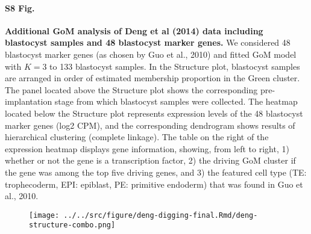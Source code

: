 \documentclass[10pt,letterpaper]{article}
\begin{document}
\paragraph*{S8 Fig.}

\label{figS8}
{\bf Additional GoM analysis of Deng et al (2014) data including blastocyst samples and 48 blastocyst marker genes.} We considered 48 blastocyst marker genes 
(as chosen by Guo et al., 2010) and fitted GoM model with $K = 3$ to 133 blastocyst samples. In the Structure plot, blastocyst samples are arranged in order of estimated membership proportion in the Green cluster. The panel located above the Structure plot shows the corresponding pre-implantation stage from which blastocyst samples were collected. The heatmap located below the Structure plot represents expression levels of the 48 blastocyst marker genes (log2 CPM), and the corresponding dendrogram shows results of hierarchical clustering (complete linkage). The table on the right of the expression heatmap displays gene information, showing, from left to right, 1) whether or not the gene is a transcription factor, 2) the driving GoM cluster if the gene was among the top five driving genes, and 3) the featured cell type (TE: trophecoderm, EPI: epiblast, PE: primitive endoderm) that was found in Guo et al., 2010.
\begin{figure}[ht]
\centering
\texttt{[image: ../../src/figure/deng-digging-final.Rmd/deng-structure-combo.png]}
\end{figure}
\end{document}
